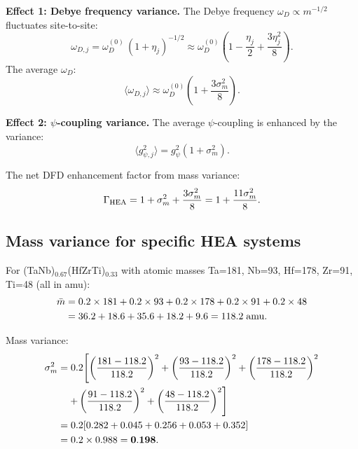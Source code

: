 \documentclass[11pt]{article}
\begin{document}
\textbf{Effect 1: Debye frequency variance.} The Debye frequency
$\omega_D \propto m^{-1/2}$ fluctuates site-to-site:
\begin{equation}
\omega_{D,j} = \omega_D^{(0)}\,(1 + \eta_j)^{-1/2}
\approx \omega_D^{(0)}\!\left(1 - \frac{\eta_j}{2} + \frac{3\eta_j^2}{8}\right).
\label{eq:omegaD-HEA}
\end{equation}
The average $\omega_D$:
\begin{equation}
\langle\omega_{D,j}\rangle \approx \omega_D^{(0)}\!\left(1 + \frac{3\sigma_m^2}{8}\right).
\label{eq:omegaD-avg}
\end{equation}

\textbf{Effect 2: $\psi$-coupling variance.} The average $\psi$-coupling
is enhanced by the variance:
\begin{equation}
\langle g_{\psi,j}^2 \rangle = g_\psi^2(1 + \sigma_m^2).
\label{eq:g-psi-variance}
\end{equation}

The net DFD enhancement factor from mass variance:
\begin{equation}
\Gamma_{\rm HEA} = 1 + \sigma_m^2 + \frac{3\sigma_m^2}{8}
= 1 + \frac{11\sigma_m^2}{8}.
\label{eq:Gamma-HEA}
\end{equation}

\subsection{Mass variance for specific HEA systems}

For (TaNb)$_{0.67}$(HfZrTi)$_{0.33}$ with atomic masses
Ta=181, Nb=93, Hf=178, Zr=91, Ti=48 (all in amu):
\begin{align}
\bar{m} &= 0.2\times181 + 0.2\times93 + 0.2\times178 + 0.2\times91 + 0.2\times48 \notag\\
&= 36.2 + 18.6 + 35.6 + 18.2 + 9.6 = 118.2\;\text{amu}.
\label{eq:mbar-HEA1}
\end{align}

Mass variance:
\begin{align}
\sigma_m^2 &= 0.2\!\left[\left(\frac{181-118.2}{118.2}\right)^2
  + \left(\frac{93-118.2}{118.2}\right)^2 + \left(\frac{178-118.2}{118.2}\right)^2 \right.\notag\\
&\quad\left.+ \left(\frac{91-118.2}{118.2}\right)^2 + \left(\frac{48-118.2}{118.2}\right)^2\right]\notag\\
&= 0.2[0.282 + 0.045 + 0.256 + 0.053 + 0.352]\notag\\
&= 0.2 \times 0.988 = \mathbf{0.198}.
\label{eq:sigma-HEA1}
\end{align}
\end{document}
